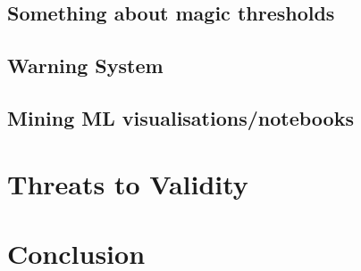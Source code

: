 \documentclass[acmsmall,screen,review,anonymous]{acmart}
\begin{document}
\subsection{Something about magic thresholds}\label{sec:magic-threshold}

\subsection{Warning System}\label{sec:drift}

\subsection{Mining ML visualisations/notebooks}

\section{Threats to Validity}\label{sec:threats}

\section{Conclusion}\label{sec:conclude}



\end{document}
